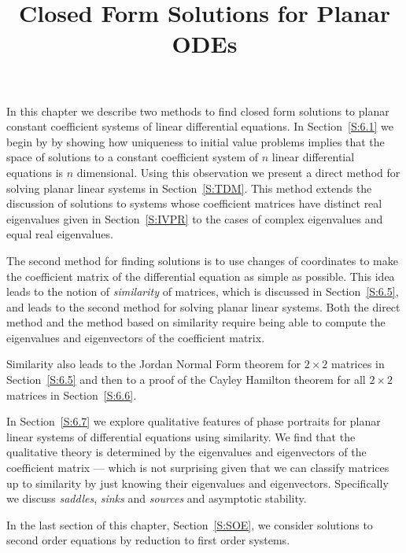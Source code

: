 \documentclass{ximera}
\title{Closed Form Solutions for Planar ODEs}
\begin{document}
\begin{abstract}
\end{abstract}
\maketitle


\label{Chap:Planar}

\normalsize

In this chapter we describe two methods to find closed form
solutions to planar constant coefficient systems of linear differential
equations.  In Section~\ref{S:6.1} we begin by by showing how uniqueness to
initial value problems implies that the space of solutions to a constant
coefficient system of $n$ linear differential equations is $n$ dimensional.
Using this observation we present a direct method for solving planar linear
systems in Section~\ref{S:TDM}.  This method extends the discussion of
solutions to systems whose coefficient matrices have distinct real
eigenvalues given in Section~\ref{S:IVPR} to the cases of complex
eigenvalues and equal real eigenvalues.

The second method for finding solutions is to use changes of coordinates to 
make the coefficient matrix of the differential equation as simple as possible.  
This idea leads to the notion of {\em similarity\/} of matrices, which is discussed 
in Section~\ref{S:6.5}, and leads to the second method for solving planar linear 
systems. Both the direct method and the method based on similarity require 
being able to compute the eigenvalues and eigenvectors of the coefficient matrix.

Similarity also leads to the Jordan Normal Form theorem for 
$2\times 2$ matrices in Section~\ref{S:6.5} and then to a proof of the Cayley 
Hamilton theorem for all $2\times 2$ matrices in Section~\ref{S:6.6}.

In Section~\ref{S:6.7} we explore qualitative features of phase portraits for planar 
linear systems of differential equations using similarity.  We find that the 
qualitative theory is determined by the eigenvalues and 
eigenvectors of the coefficient matrix --- which is not surprising given
that we can classify matrices up to similarity by just knowing their
eigenvalues and eigenvectors.  Specifically we discuss {\em saddles\/},
{\em sinks\/} and {\em sources\/} and asymptotic stability.


In the last section of this chapter, Section~\ref{S:SOE}, we consider
solutions to second order equations by reduction to first order systems.
\end{document}
